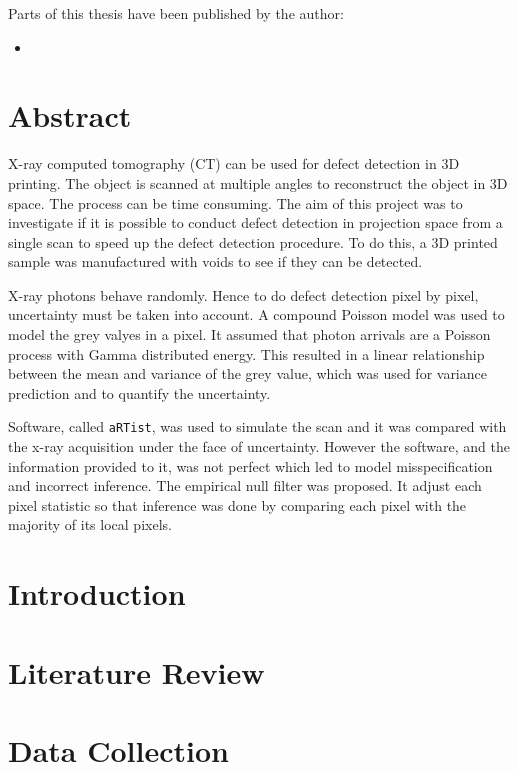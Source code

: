 \documentclass[12pt, a4paper]{memoir}
\begin{document}
Parts of this thesis have been published by the author:
\begin{itemize}
  \item\nobibliography*{}
\end{itemize}

\chapter{Abstract}
X-ray computed tomography (CT) can be used for defect detection in 3D printing. The object is scanned at multiple angles to reconstruct the object in 3D space. The process can be time consuming. The aim of this project was to investigate if it is possible to conduct defect detection in projection space from a single scan to speed up the defect detection procedure. To do this, a 3D printed sample was manufactured with voids to see if they can be detected.

X-ray photons behave randomly. Hence to do defect detection pixel by pixel, uncertainty must be taken into account. A compound Poisson model was used to model the grey valyes in a pixel. It assumed that photon arrivals are a Poisson process with Gamma distributed energy. This resulted in a linear relationship between the mean and variance of the grey value, which was used for variance prediction and to quantify the uncertainty.

Software, called \texttt{aRTist}, was used to simulate the scan and it was compared with the x-ray acquisition under the face of uncertainty. However the software, and the information provided to it, was not perfect which led to model misspecification and incorrect inference. The empirical null filter was proposed. It adjust each pixel statistic so that inference was done by comparing each pixel with the majority of its local pixels.

\newpage

\mainmatter

\chapter{Introduction}

\chapter{Literature Review}


\chapter{Data Collection}

\end{document}
